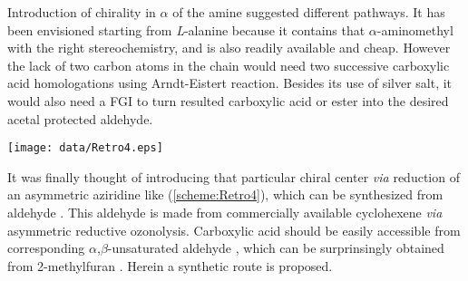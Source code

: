 Introduction of chirality in $\alpha$ of the amine suggested different pathways. It has been envisioned starting from \textit{L}-alanine because it contains that $\alpha$-aminomethyl with the right stereochemistry, and is also readily available and cheap. However the lack of two carbon atoms in the chain would need two successive carboxylic acid  homologations using Arndt-Eistert reaction. Besides its use of silver salt, it would also need a FGI to turn resulted carboxylic acid or ester into the desired acetal protected aldehyde.
\begin{figure''}
\centering
		\texttt{[image: data/Retro4.eps]}	
    \label{scheme:Retro4}
\end{figure''}
It was finally thought of introducing that particular chiral center \textit{via} reduction of an asymmetric aziridine like  (\ref{scheme:Retro4}), which can be synthesized from aldehyde . This aldehyde is made from commercially available cyclohexene  \textit{via} asymmetric  reductive ozonolysis. Carboxylic acid  should be easily accessible from corresponding $\alpha$,$\beta$-unsaturated aldehyde , which can be surprinsingly obtained from 2-methylfuran \autocite{Greatrex14}. Herein a synthetic route is proposed.